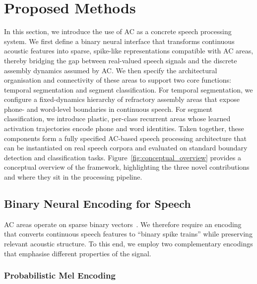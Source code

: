 \section{Proposed Methods}
In this section, we introduce the use of AC as a concrete speech processing system. We first define a binary neural interface that transforms continuous acoustic features into sparse, spike-like representations compatible with AC areas, thereby bridging the gap between real-valued speech signals and the discrete assembly dynamics assumed by AC. We then specify the architectural organisation and connectivity of these areas to support two core functions: temporal segmentation and segment classification. For temporal segmentation, we configure a fixed-dynamics hierarchy of refractory assembly areas that expose phone- and word-level boundaries in continuous speech. For segment classification, we introduce plastic, per-class recurrent areas whose learned activation trajectories encode phone and word identities. Taken together, these components form a fully specified AC-based speech processing architecture that can be instantiated on real speech corpora and evaluated on standard boundary detection and classification tasks.
Figure~\ref{fig:conceptual_overview} provides a conceptual overview of the framework, highlighting the three novel contributions and where they sit in the processing pipeline.


\subsection{Binary Neural Encoding for Speech}

AC areas operate on sparse binary vectors~\cite{papadimitriouBrainComputationAssemblies2020}. We therefore require an encoding that converts continuous speech features to ``binary spike trains'' while preserving relevant acoustic structure. To this end, we employ two complementary encodings that emphasise different properties of the signal.

\subsubsection{Probabilistic Mel Encoding}
\label{sec:prob_bin}

